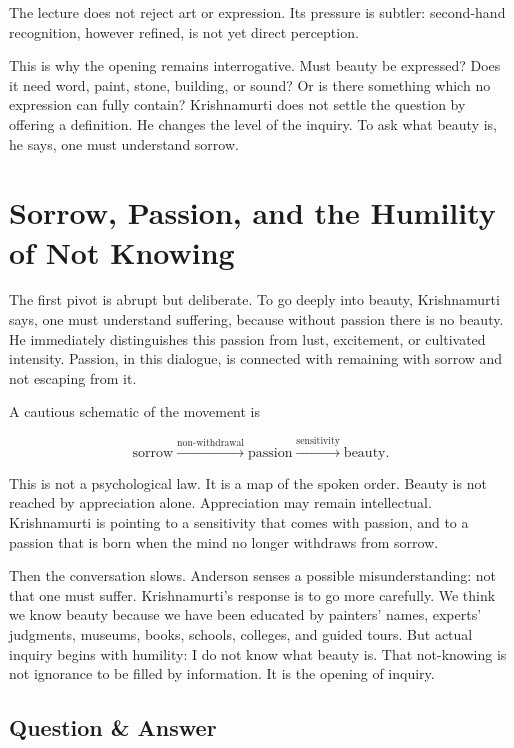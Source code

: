\begin{remark}
The lecture does not reject art or expression. Its pressure is subtler: second-hand recognition, however refined, is not yet direct perception.
\end{remark}

This is why the opening remains interrogative. Must beauty be expressed? Does it need word, paint, stone, building, or sound? Or is there something which no expression can fully contain? Krishnamurti does not settle the question by offering a definition. He changes the level of the inquiry. To ask what beauty is, he says, one must understand sorrow.

\section{Sorrow, Passion, and the Humility of Not Knowing}

The first pivot is abrupt but deliberate. To go deeply into beauty, Krishnamurti says, one must understand suffering, because without passion there is no beauty. He immediately distinguishes this passion from lust, excitement, or cultivated intensity. Passion, in this dialogue, is connected with remaining with sorrow and not escaping from it.

A cautious schematic of the movement is

\begin{equation}
\text{sorrow}
\xrightarrow{\text{non-withdrawal}}
\text{passion}
\xrightarrow{\text{sensitivity}}
\text{beauty}.
\end{equation}

This is not a psychological law. It is a map of the spoken order. Beauty is not reached by appreciation alone. Appreciation may remain intellectual. Krishnamurti is pointing to a sensitivity that comes with passion, and to a passion that is born when the mind no longer withdraws from sorrow.

Then the conversation slows. Anderson senses a possible misunderstanding: not that one must suffer. Krishnamurti's response is to go more carefully. We think we know beauty because we have been educated by painters' names, experts' judgments, museums, books, schools, colleges, and guided tours. But actual inquiry begins with humility: I do not know what beauty is. That not-knowing is not ignorance to be filled by information. It is the opening of inquiry.

\subsection{Question \& Answer}

